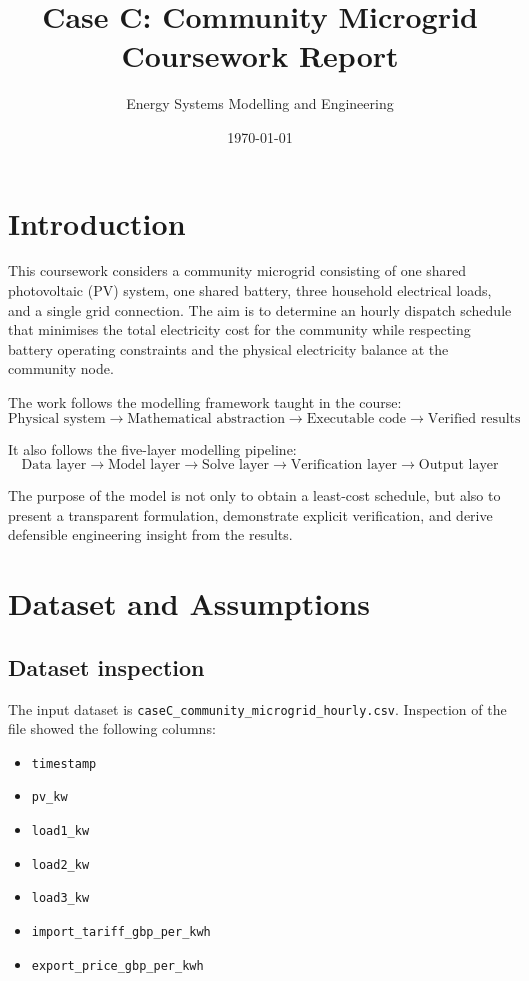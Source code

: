 \documentclass[12pt,a4paper]{article}
\title{Case C: Community Microgrid Coursework Report}
\author{Energy Systems Modelling and Engineering}
\date{\today}
\begin{document}
\maketitle

\section{Introduction}

This coursework considers a community microgrid consisting of one shared photovoltaic (PV) system, one shared battery, three household electrical loads, and a single grid connection. The aim is to determine an hourly dispatch schedule that minimises the total electricity cost for the community while respecting battery operating constraints and the physical electricity balance at the community node.

The work follows the modelling framework taught in the course:
\[
\text{Physical system} \rightarrow \text{Mathematical abstraction} \rightarrow \text{Executable code} \rightarrow \text{Verified results}
\]

It also follows the five-layer modelling pipeline:
\[
\text{Data layer} \rightarrow \text{Model layer} \rightarrow \text{Solve layer} \rightarrow \text{Verification layer} \rightarrow \text{Output layer}
\]

The purpose of the model is not only to obtain a least-cost schedule, but also to present a transparent formulation, demonstrate explicit verification, and derive defensible engineering insight from the results.

\section{Dataset and Assumptions}

\subsection{Dataset inspection}

The input dataset is \texttt{caseC\_community\_microgrid\_hourly.csv}. Inspection of the file showed the following columns:

\begin{itemize}
    \item \texttt{timestamp}
    \item \texttt{pv\_kw}
    \item \texttt{load1\_kw}
    \item \texttt{load2\_kw}
    \item \texttt{load3\_kw}
    \item \texttt{import\_tariff\_gbp\_per\_kwh}
    \item \texttt{export\_price\_gbp\_per\_kwh}
\end{itemize}
\end{document}

